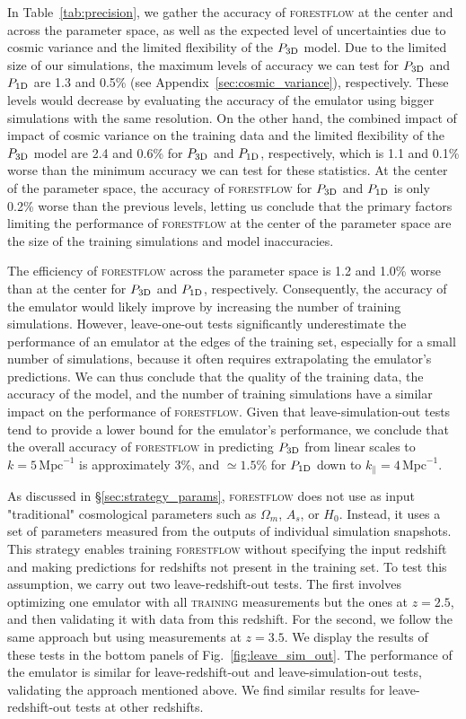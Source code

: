 \documentclass[longauth]{aa}
\newcommand{\poned}{\ensuremath{P_{\rm 1D}}\xspace}
\newcommand{\pthreed}{\ensuremath{P_{\rm 3D}}\xspace}
\newcommand{\forestflow}{\textsc{forestflow}\xspace}
\newcommand{\lacehc}{\textsc{training}\xspace}
\newcommand{\iMpc}{\ensuremath{\,\mathrm{Mpc}^{-1}}}
\begin{document}
In Table~\ref{tab:precision}, we gather the accuracy of \forestflow at the center and across the parameter space, as well as the expected level of uncertainties due to cosmic variance and the limited flexibility of the \pthreed model. Due to the limited size of our simulations, the maximum levels of accuracy we can test for \pthreed and \poned are 1.3 and 0.5\% (see Appendix~\ref{sec:cosmic_variance}), respectively. These levels would decrease by evaluating the accuracy of the emulator using bigger simulations with the same resolution. On the other hand, the combined impact of impact of cosmic variance on the training data and the limited flexibility of the \pthreed model are 2.4 and 0.6\% for \pthreed and \poned, respectively, which is 1.1 and 0.1\% worse than the minimum accuracy we can test for these statistics. At the center of the parameter space, the accuracy of \forestflow for \pthreed and \poned is only 0.2\% worse than the previous levels, letting us conclude that the primary factors limiting the performance of \forestflow at the center of the parameter space are the size of the training simulations and model inaccuracies. 

The efficiency of \forestflow across the parameter space is 1.2 and 1.0\% worse than at the center for \pthreed and \poned, respectively. Consequently, the accuracy of the emulator would likely improve by increasing the number of training simulations. However, leave-one-out tests significantly underestimate the performance of an emulator at the edges of the training set, especially for a small number of simulations, because it often requires extrapolating the emulator's predictions. We can thus conclude that the quality of the training data, the accuracy of the model, and the number of training simulations have a similar impact on the performance of \forestflow. Given that leave-simulation-out tests tend to provide a lower bound for the emulator's performance, we conclude that the overall accuracy of \forestflow in predicting \pthreed from linear scales to $k=5\iMpc$ is approximately 3\%, and $\simeq1.5\%$ for \poned down to $k_\parallel=4\iMpc$.

As discussed in \S\ref{sec:strategy_params}, \forestflow does not use as input "traditional" cosmological parameters such as $\Omega_m$, $A_s$, or $H_0$. Instead, it uses a set of parameters measured from the outputs of individual simulation snapshots. This strategy enables training \forestflow without specifying the input redshift and making predictions for redshifts not present in the training set. To test this assumption, we carry out two leave-redshift-out tests. The first involves optimizing one emulator with all \lacehc measurements but the ones at $z=2.5$, and then validating it with data from this redshift. For the second, we follow the same approach but using measurements at $z=3.5$. We display the results of these tests in the bottom panels of Fig.~\ref{fig:leave_sim_out}. The performance of the emulator is similar for leave-redshift-out and leave-simulation-out tests, validating the approach mentioned above. We find similar results for leave-redshift-out tests at other redshifts.
\end{document}
